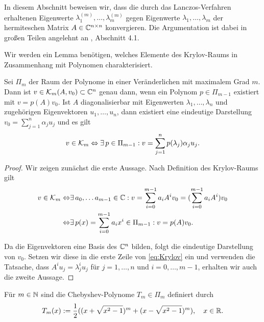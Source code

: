 \documentclass{article}
\begin{document}
In diesem Abschnitt beweisen wir, dass die durch das Lanczos-Verfahren erhaltenen Eigenwerte $\lambda_1^{(m)},\dots,\lambda_m^{(m)}$ gegen Eigenwerte $\lambda_1,\dots,\lambda_m$ der hermiteschen Matrix $A \in \mathbb{C}^{n \times n}$ konvergieren. Die Argumentation ist dabei in großen Teilen angelehnt an \cite{EWPs}, Abschnitt 4.1.

Wir werden ein Lemma benötigen, welches Elemente des Krylov-Raums in Zusammenhang mit Polynomen charakterisiert.

\begin{lemma}
	\label{v0_Polynom_Darstellung}
	Sei $\Pi_m$ der Raum der Polynome in einer Veränderlichen mit maximalem Grad $m$. Dann ist $v \in \mathcal{K}_m(A,v_0) \subset \mathbb{C}^n$ genau dann, wenn ein Polynom $p \in \Pi_{m-1}$ existiert mit $v = p(A)v_0$. \newline
	Ist $A$ diagonalisierbar mit Eigenwerten $\lambda_1, \dots, \lambda_n$ und zugehörigen Eigenvektoren $u_1, \dots, u_n$, dann existiert eine eindeutige Darstellung $v_0 = \sum_{j=1}^{n} \alpha_j u_j$ und es gilt
	\begin{align*}
		v \in \mathcal{K}_m \Leftrightarrow \exists \, p \in \Pi_{m-1}: v = \sum_{j=1}^{n} p(\lambda_j)\alpha_j u_j.
	\end{align*}
\end{lemma}

\begin{proof}
	Wir zeigen zunächst die erste Aussage. Nach Definition des Krylov-Raums gilt
	\begin{align}
		v \in \mathcal{K}_m \Leftrightarrow& \exists \, a_0, \dots a_{m-1} \in \mathbb{C}: v = \sum_{i=0}^{m-1} a_i A^i v_0 = (\sum_{i=0}^{m-1} a_i A^i)v_0\\
		\Leftrightarrow& \exists \, p(x) = \sum_{i=0}^{m-1} a_i x^i \in \Pi_{m-1}: v = p(A)v_0.
		\label{eq:Krylov}
	\end{align}

	Da die Eigenvektoren eine Basis des $\mathbb{C}^n$ bilden, folgt die eindeutige Darstellung von $v_0$. Setzen wir diese in die erste Zeile von \ref{eq:Krylov} ein und verwenden die Tatsache, dass $A^i u_j = \lambda_j^i u_j$ für $j=1,\dots, n $ und $i = 0, \dots, m-1$, erhalten wir auch die zweite Aussage.
\end{proof}


\begin{definition}
	Für $m \in \mathbb{N}$ sind die Chebyshev-Polynome $T_m \in \Pi_m$ definiert durch
	\begin{align}\label{chebyshev}
		T_m(x) := \frac{1}{2}((x+ \sqrt{x^2 - 1})^m + (x- \sqrt{x^2 - 1})^m), \quad x \in \mathbb{R}.
	\end{align}
\end{definition}
\end{document}

